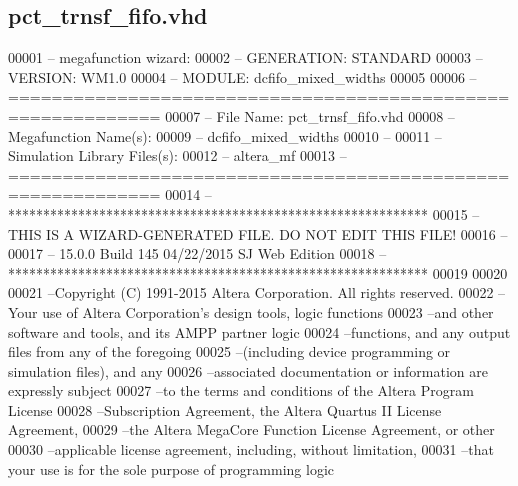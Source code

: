 \subsection{pct\+\_\+trnsf\+\_\+fifo.\+vhd}
\label{pct__trnsf__fifo_8vhd_source}

\begin{DoxyCode}
00001 \textcolor{keyword}{-- megafunction wizard: %
00002 \textcolor{keyword}{-- GENERATION: STANDARD}
00003 \textcolor{keyword}{-- VERSION: WM1.0}
00004 \textcolor{keyword}{-- MODULE: dcfifo\_mixed\_widths }
00005 
00006 \textcolor{keyword}{-- ============================================================}
00007 \textcolor{keyword}{-- File Name: pct\_trnsf\_fifo.vhd}
00008 \textcolor{keyword}{-- Megafunction Name(s):}
00009 \textcolor{keyword}{--          dcfifo\_mixed\_widths}
00010 \textcolor{keyword}{--}
00011 \textcolor{keyword}{-- Simulation Library Files(s):}
00012 \textcolor{keyword}{--          altera\_mf}
00013 \textcolor{keyword}{-- ============================================================}
00014 \textcolor{keyword}{-- ************************************************************}
00015 \textcolor{keyword}{-- THIS IS A WIZARD-GENERATED FILE. DO NOT EDIT THIS FILE!}
00016 \textcolor{keyword}{--}
00017 \textcolor{keyword}{-- 15.0.0 Build 145 04/22/2015 SJ Web Edition}
00018 \textcolor{keyword}{-- ************************************************************}
00019 
00020 
00021 \textcolor{keyword}{--Copyright (C) 1991-2015 Altera Corporation. All rights reserved.}
00022 \textcolor{keyword}{--Your use of Altera Corporation's design tools, logic functions }
00023 \textcolor{keyword}{--and other software and tools, and its AMPP partner logic }
00024 \textcolor{keyword}{--functions, and any output files from any of the foregoing }
00025 \textcolor{keyword}{--(including device programming or simulation files), and any }
00026 \textcolor{keyword}{--associated documentation or information are expressly subject }
00027 \textcolor{keyword}{--to the terms and conditions of the Altera Program License }
00028 \textcolor{keyword}{--Subscription Agreement, the Altera Quartus II License Agreement,}
00029 \textcolor{keyword}{--the Altera MegaCore Function License Agreement, or other }
00030 \textcolor{keyword}{--applicable license agreement, including, without limitation, }
00031 \textcolor{keyword}{--that your use is for the sole purpose of programming logic }
}
\end{DoxyCode}
